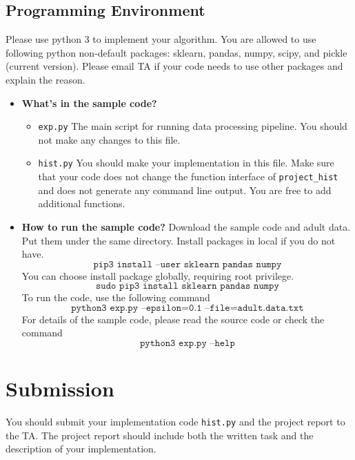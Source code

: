 \documentclass{article}
\begin{document}
\subsection{Programming Environment}
Please use python 3 to implement your algorithm.  You are allowed to use following python non-default packages: sklearn, pandas, numpy, scipy, and pickle (current version).  Please email TA if your code needs to use other packages and explain the reason.

\begin{itemize}
    \item \textbf{What's in the sample code?}
        \begin{itemize}
            \item \texttt{exp.py} The main script for running data processing pipeline. You should not make any changes to this file.
            \item \texttt{hist.py} You should make your implementation in this file. Make sure that your code does not change the function interface of \texttt{project\_hist} and does not generate any command line output. You are free to add additional functions.
        \end{itemize}
    \item \textbf{How to run the sample code?}
        Download the sample code and adult data. Put them under the same directory. Install packages in local if you do not have.
        $$\texttt{pip3 install --user sklearn pandas numpy}$$
        You can choose install package globally, requiring root privilege.
        $$\texttt{sudo pip3 install sklearn pandas numpy}$$
        To run the code, use the following command
        $$\texttt{python3 exp.py --epsilon=0.1 --file=adult.data.txt}$$
        For details of the sample code, please read the source code or check the command $$\texttt{python3 exp.py --help}$$
\end{itemize}

\section{Submission}
You should submit your implementation code \texttt{hist.py} and the project report to the TA. The project report should include both the written task and the description of your implementation.
\end{document}
